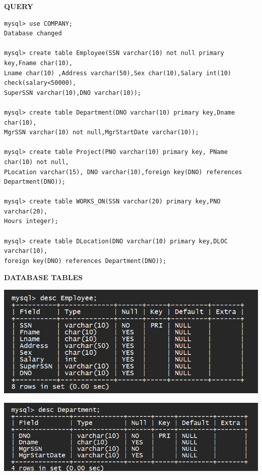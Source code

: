 \documentclass[a4paper,12pt]{report}
\begin{document}
	\begin{flushleft}
		\textbf{QUERY }
	\end{flushleft}
\begin{verbatim}
mysql> use COMPANY;
Database changed

mysql> create table Employee(SSN varchar(10) not null primary key,Fname char(10),
Lname char(10) ,Address varchar(50),Sex char(10),Salary int(10) check(salary<50000),
SuperSSN varchar(10),DNO varchar(10));

mysql> create table Department(DNO varchar(10) primary key,Dname char(10),
MgrSSN varchar(10) not null,MgrStartDate varchar(10));

mysql> create table Project(PNO varchar(10) primary key, PName char(10) not null,
PLocation varchar(15), DNO varchar(10),foreign key(DNO) references Department(DNO));

mysql> create table WORKS_ON(SSN varchar(20) primary key,PNO varchar(20),
Hours integer);

mysql> create table DLocation(DNO varchar(10) primary key,DLOC varchar(10),
foreign key(DNO) references Department(DNO));

\end{verbatim}

	\begin{flushleft}
		\textbf{DATABASE TABLES}
	\end{flushleft} 

     
\includegraphics[scale=0.7]{Screenshot (450).png}
\vspace{10mm}
   
   \includegraphics[scale=0.7]{Screenshot (450)1.png}
    
\end{document}
